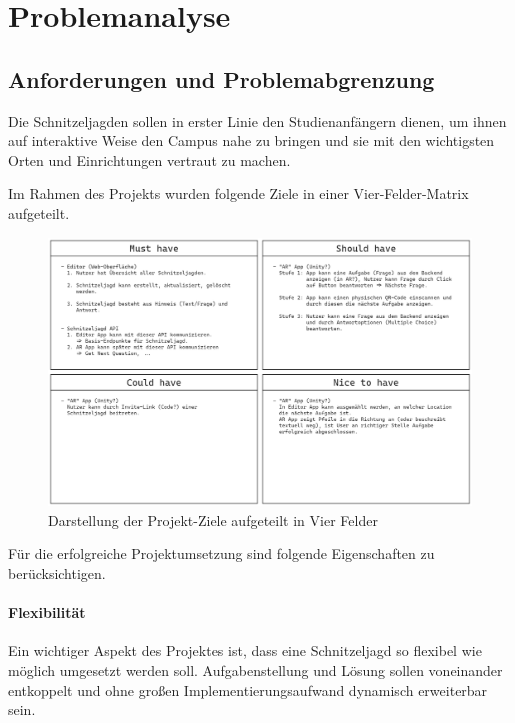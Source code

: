 \chapter{Problemanalyse} \label{cha:problemanalyse}

\section{Anforderungen und Problemabgrenzung} \label{cha:problemanalyse:abgrenzung}

Die Schnitzeljagden sollen in erster Linie den Studienanfängern dienen, um ihnen auf interaktive Weise den Campus nahe zu bringen und sie mit den wichtigsten Orten und Einrichtungen vertraut zu machen.

Im Rahmen des Projekts wurden folgende Ziele in einer Vier-Felder-Matrix aufgeteilt.

\begin{figure}[H]
    \centering
    \includegraphics[width=\textwidth]{images/PrAr_ProblemAnalysis_Vierfelder.png}
    \caption{Darstellung der Projekt-Ziele aufgeteilt in Vier Felder}
    \label{fig:problemanalyse:vierfeldermatrixamarsch}
\end{figure}

Für die erfolgreiche Projektumsetzung sind folgende Eigenschaften zu berücksichtigen.

\subsubsection{Flexibilität}

Ein wichtiger Aspekt des Projektes ist, dass eine Schnitzeljagd so flexibel wie möglich umgesetzt werden soll. Aufgabenstellung und Lösung sollen voneinander entkoppelt und ohne großen Implementierungsaufwand dynamisch erweiterbar sein.

